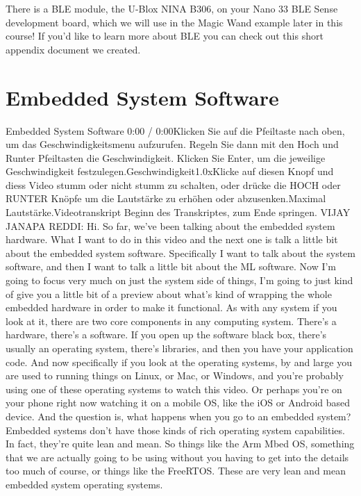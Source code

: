     There is a BLE module, the U-Blox NINA B306, on your Nano 33 BLE Sense development board, which we will use in the Magic Wand example later in this course! If you’d like to learn more about BLE you can check out this short appendix document we created.
    
    
    
\section{Embedded System Software}

Embedded System Software
0:00 / 0:00Klicken Sie auf die Pfeiltaste nach oben, um das Geschwindigkeitsmenu aufzurufen. Regeln Sie dann mit den Hoch und Runter Pfeiltasten die Geschwindigkeit. Klicken Sie Enter, um die jeweilige Geschwindigkeit festzulegen.Geschwindigkeit1.0xKlicke auf diesen Knopf und diess Video stumm oder nicht stumm zu schalten, oder drücke die HOCH oder RUNTER Knöpfe um die Lautstärke zu erhöhen oder abzusenken.Maximal Lautstärke.Videotranskript
Beginn des Transkriptes, zum Ende springen.
VIJAY JANAPA REDDI: Hi.
So far, we've been talking about the embedded system hardware.
What I want to do in this video and the next one
is talk a little bit about the embedded system software.
Specifically I want to talk about the system software,
and then I want to talk a little bit about the ML software.
Now I'm going to focus very much on just the system side of things,
I'm going to just kind of give you a little bit of a preview about what's
kind of wrapping the whole embedded hardware in order
to make it functional.
As with any system if you look at it, there
are two core components in any computing system.
There's a hardware, there's a software.
If you open up the software black box, there's usually an operating system,
there's libraries, and then you have your application code.
And now specifically if you look at the operating systems,
by and large you are used to running things on Linux, or Mac, or Windows,
and you're probably using one of these operating systems to watch this video.
Or perhaps you're on your phone right now watching it on a mobile OS,
like the iOS or Android based device.
And the question is, what happens when you go to an embedded system?
Embedded systems don't have those kinds of rich operating system capabilities.
In fact, they're quite lean and mean.
So things like the Arm Mbed OS, something that we are actually
going to be using without you having to get
into the details too much of course, or things like the FreeRTOS.
These are very lean and mean embedded system operating systems.
